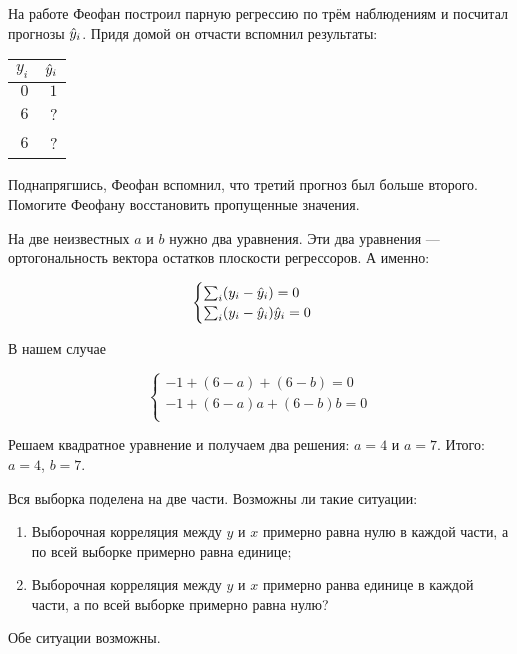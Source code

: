 \begin{problem} %
На работе Феофан построил парную регрессию по трём наблюдениям и посчитал прогнозы $\hat{y}_i$. Придя домой он отчасти вспомнил результаты:

\begin{tabular}{rr}
\toprule
$y_i$ & $\hat{y}_i$ \\
\midrule
$0$ & $1$ \\
$6$ & ? \\
$6$ & ? \\
\bottomrule
\end{tabular}

Поднапрягшись, Феофан вспомнил, что третий прогноз был больше второго. Помогите Феофану восстановить пропущенные значения.


\begin{sol}
На две неизвестных $a$ и $b$ нужно два уравнения. Эти два уравнения — ортогональность вектора остатков плоскости регрессоров. А именно:

\[
\begin{cases}
\sum_i (y_i - \hat{y}_i) = 0 \\
\sum_i (y_i - \hat{y}_i) \hat{y}_i = 0 \\
\end{cases}
\]

В нашем случае

\[
\begin{cases}
-1 +(6-a) + (6-b) = 0 \\
-1 + (6 - a)a + (6-b)b = 0 \\
\end{cases}
\]

Решаем квадратное уравнение и получаем два решения: $a=4$ и $a=7$. Итого: $a=4$, $b=7$.
\end{sol}
\end{problem}


\begin{problem}
Вся выборка поделена на две части. Возможны ли такие ситуации:
\begin{enumerate}
\item Выборочная корреляция между $y$ и $x$ примерно равна нулю в каждой части, а по всей выборке примерно равна единице;
\item Выборочная корреляция между $y$ и $x$ примерно ранва единице в каждой части, а по всей выборке примерно равна нулю?
\end{enumerate}

\begin{sol}
Обе ситуации возможны.
\end{sol}
\end{problem}





